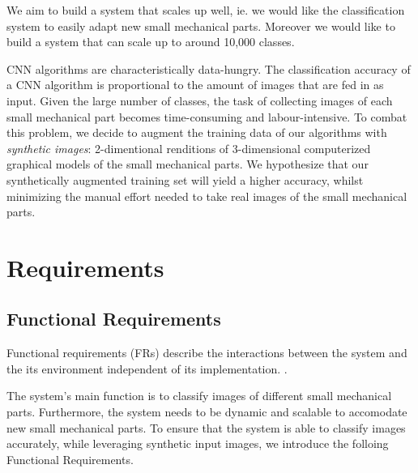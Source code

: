 \documentclass[a4paper,12pt,twoside]{report}
\begin{document}
We aim to build a system that scales up well, ie. we would like the classification system to easily adapt new small mechanical parts. Moreover we would like to build a system that can scale up to around 10,000 classes.

CNN algorithms are characteristically data-hungry. The classification accuracy of a CNN algorithm is proportional to the amount of images that are fed in as input. Given the large number of classes, the task of collecting images of each small mechanical part becomes time-consuming and labour-intensive. To combat this problem, we decide to augment the training data of our algorithms with \textit{synthetic images}: 2-dimentional renditions of 3-dimensional computerized graphical models of the small mechanical parts. We hypothesize that our synthetically augmented training set will yield a higher accuracy, whilst minimizing the manual effort needed to take real images of the small mechanical parts.

\section{Requirements}

\subsection{Functional Requirements}

Functional requirements (FRs) describe the interactions between the system and the its environment independent of its implementation. \cite{bruegge2004object}.

The system's main function is to classify images of different small mechanical parts. Furthermore, the system needs to be dynamic and scalable to accomodate new small mechanical parts. To ensure that the system is able to classify images accurately, while leveraging synthetic input images, we introduce the folloing Functional Requirements.
\end{document}
